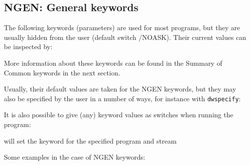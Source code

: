 \subsection{NGEN: General keywords}
\label{common.descr.newstar.ngen}

The following keywords (parameters) are used for most \NEWSTAR programs, but
they are usually hidden from the user (default switch /NOASK).
Their current values  can be inspected by:



More information about these keywords can be found in the Summary of
Common keywords in the next section.

Usually, their default values are taken for the NGEN keywords, 
but they may also be specified by the user in a number of ways,
for instance with {\tt dwspecify}:





It is also possible to give (any) keyword values as switches when running
the program:


will set the keyword for the specified program and stream

Some examples in the case of NGEN keywords:

